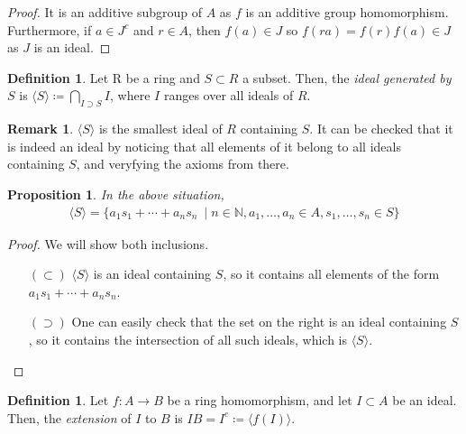 \documentclass[11pt]{article}
\newtheorem{prop}[theorem]{Proposition}
\theoremstyle{definition}
\newtheorem{defn}[theorem]{Definition}
\newtheorem{rk}[theorem]{Remark}
\begin{document}
            \begin{proof}
                It is an additive subgroup of $A$ as $f$ is an additive group homomorphism.
                Furthermore, if $a \in J^{c}$ and $r \in A$, then $f(a) \in J$ so $f(ra) = f(r)f(a) \in J$ as $J$ is an ideal.
            \end{proof}

        \begin{defn}
            Let R be a ring and $S \subset R$ a subset.
            Then, the \emph{ideal generated by} $S$ is $\langle S \rangle \coloneqq \bigcap_{I \supset S} I$, where $I$ ranges over all ideals of $R$.
        \end{defn}

        \begin{rk}
            $\langle S \rangle$ is the smallest ideal of $R$ containing $S$.
            It can be checked that it is indeed an ideal by noticing that all elements of it belong to all ideals containing $S$,
            and veryfying the axioms from there.
        \end{rk}

        \begin{prop}
            In the above situation,
            \begin{align}
                \langle S \rangle = \{a_1 s_1 + \cdots + a_n s_n\ \mid n \in \mathbb{N}, a_1, \ldots, a_n \in A, s_1, \ldots, s_n \in S\} \nonumber
            \end{align}
        \end{prop}

            \begin{proof}
                We will show both inclusions.
                \begin{itemize}
                    \item[$(\subset)$] $\langle S \rangle$ is an ideal containing $S$, so it contains all elements of the form $a_1 s_1 + \cdots + a_n s_n$.
                    \item[$(\supset)$] One can easily check that the set on the right is an ideal containing $S$,
                    so it contains the intersection of all such ideals, which is $\langle S \rangle$.
                \end{itemize}
            \end{proof}

        \begin{defn}
            Let $f: A \rightarrow B$ be a ring homomorphism, and let $I \subset A$ be an ideal.
            Then, the \emph{extension} of $ I$ to $B$ is $IB = I^{e} \coloneqq \langle f(I) \rangle$.
        \end{defn}
\end{document}
